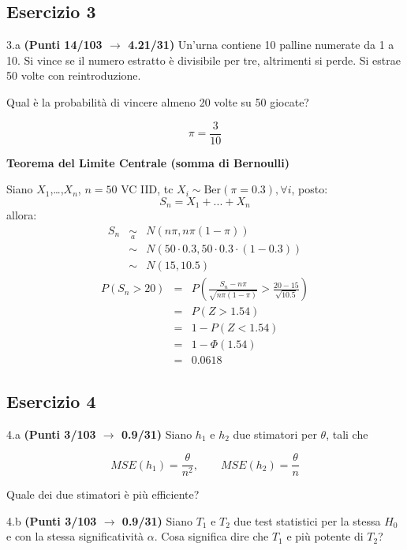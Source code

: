 \documentclass[
  11pt,
]{book}
\theoremstyle{mytheoremstyle}
\theoremstyle{mydefstyle}
\newenvironment{sol}
  {
  \begin{tcolorbox}[enhanced,breakable,arc=0.1mm,boxrule=1pt,colback=white,colframe=iblue,
  title=\bf \fontfamily{lmss}\selectfont \hspace{.5 cm} Soluzione,drop fuzzy shadow]

}{
\end{tcolorbox}
  }
\begin{document}
\subsection{Esercizio 3}\label{esercizio-3-14}

3.a \textbf{(Punti 14/103 \(\rightarrow\) 4.21/31)} Un'urna contiene 10 palline numerate da 1 a 10.
Si vince se il numero estratto è divisibile per tre, altrimenti si perde.
Si estrae 50 volte con reintroduzione.

Qual è la probabilità di vincere almeno 20 volte su 50 giocate?

\begin{sol}
\[
\pi=\frac 3{10}
\]

\textbf{Teorema del Limite Centrale (somma di Bernoulli)}

Siano \(X_1\),\ldots,\(X_n\), \(n=50\) VC IID, tc \(X_i\sim\text{Ber}(\pi=0.3)\)\(,\forall i\), posto:
\[
      S_n = X_1 + ... + X_n
      \]
allora:\begin{eqnarray*}
  S_n & \mathop{\sim}\limits_{a}& N(n\pi,n\pi(1-\pi)) \\
      &\sim & N(50\cdot0.3,50\cdot0.3\cdot(1-0.3)) \\
      &\sim & N(15,10.5)
  \end{eqnarray*}\begin{eqnarray*}
      P( S_n   >   20 ) 
        &=& P\left(  \frac { S_n  -  n\pi }{ \sqrt{n\pi(1-\pi)} }  >  \frac { 20  -  15 }{\sqrt{ 10.5 }} \right)  \\
                 &=& P\left(  Z   >   1.54 \right) \\    &=& 1-P(Z< 1.54 )\\ 
                 &=&  1-\Phi( 1.54 ) \\ &=&  0.0618 
      \end{eqnarray*}

\end{sol}

\subsection{Esercizio 4}\label{esercizio-4-14}

4.a \textbf{(Punti 3/103 \(\rightarrow\) 0.9/31)} Siano \(h_1\) e \(h_2\) due stimatori per \(\theta\), tali che

\[
  MSE(h_1) =  \frac{\theta}{n^2}, \qquad  MSE(h_2) =  \frac{\theta}{n}
\]

Quale dei due stimatori è più efficiente?

4.b \textbf{(Punti 3/103 \(\rightarrow\) 0.9/31)} Siano \(T_1\) e \(T_2\) due test statistici per la stessa \(H_0\) e con la stessa significatività \(\alpha\). Cosa significa dire che \(T_1\) e più potente di \(T_2\)?
\end{document}
